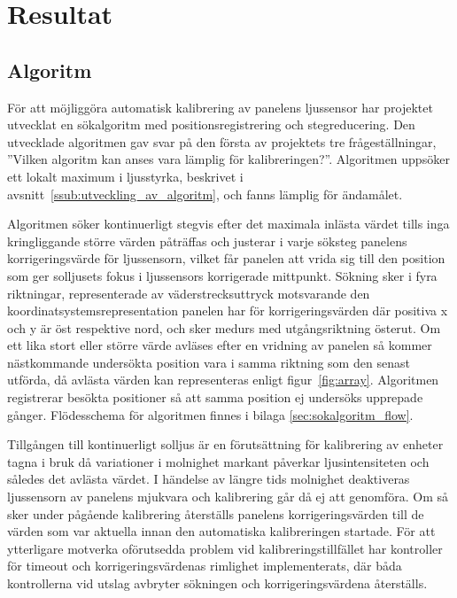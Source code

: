\section{Resultat} %
\label{sec:resultat}
    \subsection{Algoritm} %
    \label{sub:algoritm}
        För att möjliggöra automatisk kalibrering av panelens ljussensor har projektet utvecklat en sökalgoritm med positionsregistrering och stegreducering. Den utvecklade algoritmen gav svar på den första av projektets tre frågeställningar, ''Vilken algoritm kan anses vara lämplig för kalibreringen?''. Algoritmen uppsöker ett lokalt maximum i ljusstyrka, beskrivet i avsnitt~\ref{ssub:utveckling_av_algoritm}, och fanns lämplig för ändamålet.\bigskip

        Algoritmen söker kontinuerligt stegvis efter det maximala inlästa värdet tills inga kringliggande större värden påträffas och justerar i varje söksteg panelens korrigeringsvärde för ljussensorn, vilket får panelen att vrida sig till den position som ger solljusets fokus i ljussensors korrigerade mittpunkt. Sökning sker i fyra riktningar, representerade av väderstrecksuttryck motsvarande den koordinatsystemsrepresentation panelen har för korrigeringsvärden där positiva x och y är öst respektive nord, och sker medurs med utgångsriktning österut. Om ett lika stort eller större värde avläses efter en vridning av panelen så kommer nästkommande undersökta position vara i samma riktning som den senast utförda, då avlästa värden kan representeras enligt figur~\ref{fig:array}. Algoritmen registrerar besökta positioner så att samma position ej undersöks upprepade gånger. Flödesschema för algoritmen finnes i bilaga \ref{sec:sokalgoritm_flow}. \bigskip

        Tillgången till kontinuerligt solljus är en förutsättning för kalibrering av enheter tagna i bruk då variationer i molnighet markant påverkar ljusintensiteten och således det avlästa värdet. I händelse av längre tids molnighet deaktiveras ljussensorn av panelens mjukvara och kalibrering går då ej att genomföra. Om så sker under pågående kalibrering återställs panelens korrigeringsvärden till de värden som var aktuella innan den automatiska kalibreringen startade. För att ytterligare motverka oförutsedda problem vid kalibreringstillfället har kontroller för timeout och korrigeringsvärdenas rimlighet implementerats, där båda kontrollerna vid utslag avbryter sökningen och korrigeringsvärdena återställs.

